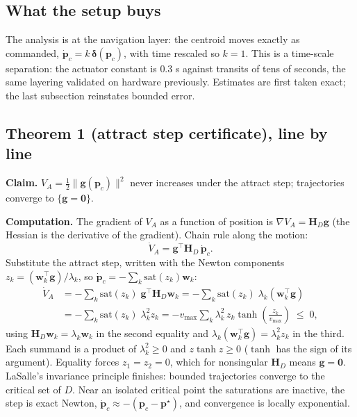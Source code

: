 \documentclass[11pt]{article}
\begin{document}
\subsection{What the setup buys}

The analysis is at the navigation layer: the centroid moves exactly as
commanded, $\dot{\mathbf{p}}_c = k\,\boldsymbol{\delta}(\mathbf{p}_c)$,
with time rescaled so $k = 1$. This is a time-scale separation: the
actuator constant is $0.3$ s against transits of tens of seconds, the same
layering validated on hardware previously. Estimates are first taken exact;
the last subsection reinstates bounded error.

\subsection{Theorem 1 (attract step certificate), line by line}

\textbf{Claim.} $V_A = \tfrac{1}{2}\|\mathbf{g}(\mathbf{p}_c)\|^2$ never
increases under the attract step; trajectories converge to
$\{\mathbf{g} = \mathbf{0}\}$.

\textbf{Computation.} The gradient of $V_A$ as a function of position is
$\nabla V_A = \mathbf{H}_D\mathbf{g}$ (the Hessian is the derivative of the
gradient). Chain rule along the motion:
\begin{equation}
\dot{V}_A = \mathbf{g}^\top\mathbf{H}_D\,\dot{\mathbf{p}}_c .
\end{equation}
Substitute the attract step, written with the Newton components
$z_k = (\mathbf{w}_k^\top\mathbf{g})/\lambda_k$, so
$\dot{\mathbf{p}}_c = -\sum_k \mathrm{sat}(z_k)\mathbf{w}_k$:
\begin{align}
\dot{V}_A
&= -\sum_k \mathrm{sat}(z_k)\;\mathbf{g}^\top\mathbf{H}_D\mathbf{w}_k
 = -\sum_k \mathrm{sat}(z_k)\;\lambda_k(\mathbf{w}_k^\top\mathbf{g}) \\
&= -\sum_k \mathrm{sat}(z_k)\;\lambda_k^2 z_k
 = -v_{\max}\sum_{k}\lambda_k^2\, z_k\tanh\!\left(\frac{z_k}{v_{\max}}\right)
 \;\leq\; 0,
\end{align}
using $\mathbf{H}_D\mathbf{w}_k = \lambda_k\mathbf{w}_k$ in the second
equality and $\lambda_k(\mathbf{w}_k^\top\mathbf{g}) = \lambda_k^2 z_k$ in
the third. Each summand is a product of $\lambda_k^2 \geq 0$ and
$z\tanh z \geq 0$ ($\tanh$ has the sign of its argument). Equality forces
$z_1 = z_2 = 0$, which for nonsingular $\mathbf{H}_D$ means
$\mathbf{g} = \mathbf{0}$. LaSalle's invariance principle finishes:
bounded trajectories converge to the critical set of $D$. Near an isolated
critical point the saturations are inactive, the step is exact Newton,
$\dot{\mathbf{p}}_c \approx -(\mathbf{p}_c - \mathbf{p}^\star)$, and
convergence is locally exponential.
\end{document}
